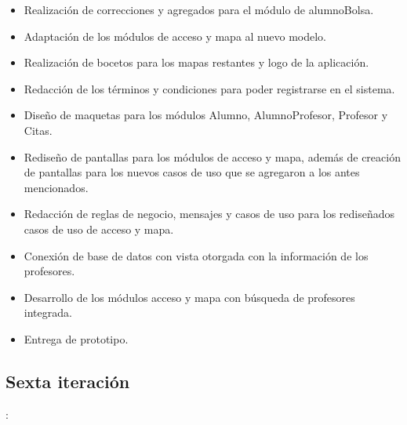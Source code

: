 \begin{itemize}
	\item Realización de correcciones y agregados para el módulo de alumnoBolsa.
	\item Adaptación de los módulos de acceso y mapa al nuevo modelo.
	\item Realización de bocetos para los mapas restantes y logo de la aplicación.
	\item Redacción de los términos y condiciones para poder registrarse en el sistema.
	\item Diseño de maquetas para los módulos Alumno, AlumnoProfesor, Profesor y Citas.
	\item Rediseño de pantallas para los módulos de acceso y mapa, además de creación de pantallas para los nuevos casos de uso que se agregaron a los antes mencionados.
	\item Redacción de reglas de negocio, mensajes y casos de uso para los rediseñados casos de uso de acceso y mapa.
	\item Conexión de base de datos con vista otorgada con la información de los profesores.
	\item Desarrollo de los módulos acceso y mapa con búsqueda de profesores integrada.
	\item Entrega de prototipo.
\end{itemize}


\subsection{Sexta iteración}: 

